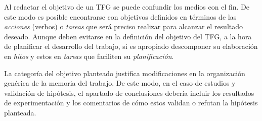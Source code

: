 Al redactar el objetivo de un TFG se puede confundir los medios con el 
fin. De este modo es posible encontrarse con objetivos definidos en términos de las 
\emph{acciones} (verbos) o \emph{tareas} que será preciso 
realizar para alcanzar el resultado deseado. Aunque deben evitarse en la definición del objetivo del TFG, a la hora de 
planificar el desarrollo del trabajo, si es apropiado descomponer su elaboración en \emph{hitos} y estos en \emph{tareas} que faciliten su 
\emph{planificación}.

La categoría del objetivo planteado justifica modificaciones en la organización genérica de la memoria del trabajo. De este modo, en el caso de estudios y validación de hipótesis, el apartado de conclusiones debería incluir los resultados de experimentación y los comentarios de cómo estos validan o refutan la hipótesis planteada.


